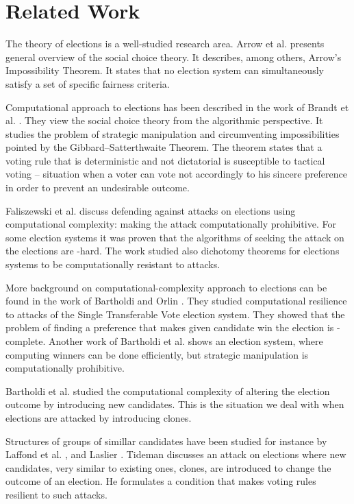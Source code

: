 \section{Related Work}

The theory of elections is a well-studied research area.
Arrow et al. \cite{handbook} presents general overview of the social choice theory.
It describes, among others, Arrow's Impossibility Theorem.
It states that no election system can simultaneously satisfy a set of specific fairness criteria.

Computational approach to elections has been described in the work of
Brandt et al. \cite{compsocialchoice}.
They view the social choice theory from the algorithmic perspective.
It studies the problem of strategic manipulation
and circumventing impossibilities pointed by the Gibbard–Satterthwaite Theorem.
The theorem states that a voting rule that is deterministic and not dictatorial is susceptible to tactical voting
-- situation when a voter can vote not accordingly to his sincere preference in order to prevent an undesirable outcome.

Faliszewski et al. \cite{usingcomplexity} discuss defending against attacks on elections using computational complexity:
making the attack computationally prohibitive.
For some election systems it was proven that the algorithms of seeking the attack on the elections are \np-hard.
The work studied also dichotomy theorems for elections systems to be computationally resistant to attacks.

More background on computational-complexity approach to elections can be found
in the work of Bartholdi and Orlin \cite{usingcomp1}.
They studied computational resilience to attacks of the Single Transferable Vote election system.
They showed that the problem of finding a preference that makes given candidate win the election is \np-complete.
Another work of Bartholdi et al. \cite{usingcomp2} shows an election system,
where computing winners can be done efficiently, but strategic manipulation is computationally prohibitive.

Bartholdi et al. \cite{controlbyadding} studied the computational complexity of altering the election
outcome by introducing new candidates.
This is the situation we deal with when elections are attacked by introducing clones.

Structures of groups of simillar candidates have been studied for instance by
Laffond et al. \cite{clones1}, and Laslier \cite{clones2, clones3}.
Tideman \cite{independenceofclones} discusses an attack on elections where new candidates,
very similar to existing ones, clones, are introduced to change the outcome of an election.
He formulates a condition that makes voting rules resilient to such attacks.

